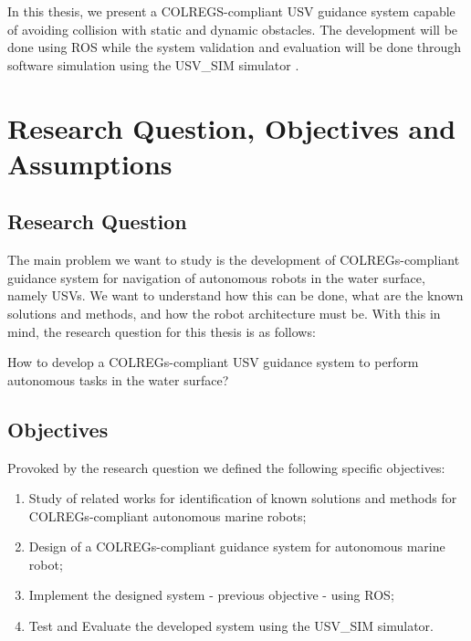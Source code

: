     In this thesis, we present a \ac{COLREGS}-compliant \ac{USV} guidance system capable of avoiding collision with static and dynamic obstacles. The development will be done using \ac{ROS} \cite{Quigley2009ROS} while the system validation and evaluation will be done through software simulation using the USV\_SIM simulator \cite{Paravisi2018Toward}.%
    
    \section{Research Question, Objectives and Assumptions}
    
    \subsection{Research Question}
    
    The main problem we want to study is the development of COLREGs-compliant guidance system for navigation of autonomous robots in the water surface, namely \acp{USV}. We want to understand how this can be done, what are the known solutions and methods, and how the robot architecture must be. With this in mind, the research question for this thesis is as follows:

    How to develop a COLREGs-compliant \ac{USV} guidance system to perform autonomous tasks in the water surface?
    
    \subsection{Objectives}
    
    Provoked by the research question we defined the following specific objectives:
    
    \begin{enumerate}
        \item Study of related works for identification of known solutions and methods for COLREGs-compliant autonomous marine robots;
        \item Design of a COLREGs-compliant guidance system for autonomous marine robot;
        \item Implement the designed system - previous objective - using \ac{ROS};
        \item Test and Evaluate the developed system using the USV\_SIM simulator.
    \end{enumerate}
    
